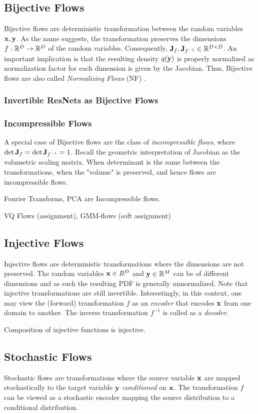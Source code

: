 \documentclass[a4paper, 11pt]{article}
\begin{document}
\subsection{Bijective Flows}
Bijective flows are deterministic transformation between the random variables $\mbox{$\mbox{$\mathbf{x}$}$}, \mbox{$\mbox{$\mathbf{y}$}$}$. As the name suggests, the transformation preserves the dimensions $f: \mathbb{R}^D \to \mathbb{R}^D$ of the random variables. Consequently, $\mbox{$\mbox{$\mathbf{J}$}$}_{f}, \mbox{$\mbox{$\mathbf{J}$}$}_{f^{-1}} \in \mathbb{R}^{D \times D}$. An important implication is that the resulting density $q(\mbox{$\mbox{$\mathbf{y}$}$})$ is properly normalized as normalization factor for each dimension is given by the Jacobian. Thus, Bijective flows are also called \emph{Normalizing Flows} (NF) \cite{papamakarios2021normalizing}. 

\subsubsection{Invertible ResNets as Bijective Flows}


\subsubsection{Incompressible Flows}
A special case of Bijective flows are the class of \emph{incompressible flows}, where $\det \mbox{$\mbox{$\mathbf{J}$}$}_f = \det \mbox{$\mbox{$\mathbf{J}$}$}_{f^{-1}} = 1$. Recall the geometric interpretation of Jacobian as the volumetric scaling matrix. When determinant is the same between the transformations, when the "volume" is preserved, and hence flows are incompressible flows. 

Fourier Transforms, PCA are Incompressible flows. 

VQ Flows (assignment), GMM-flows (soft assignment)


\subsection{Injective Flows}
Injective flows are deterministic transformations where the dimensions are not preserved. The random variables $\mbox{$\mbox{$\mathbf{x}$}$} \in R^D$ and $\mbox{$\mbox{$\mathbf{y}$}$} \in \mathbb{R}^M$ can be of different dimensions and as such the resulting PDF is generally unnormalized. Note that injective transformations are still invertible. Interestingly, in this context, one may view the (forward) transformation $f$ as an \emph{encoder} that encodes $\mbox{$\mbox{$\mathbf{x}$}$}$ from one domain to another. The inverse transformation $f^{-1}$ is called as a \emph{decoder}.


Composition of injective functions is injective.


\subsection{Stochastic Flows}
Stochastic flows are transformations where the source variable $\mbox{$\mbox{$\mathbf{x}$}$}$ are mapped stochastically to the target variable $\mbox{$\mbox{$\mathbf{y}$}$}$ \emph{conditioned} on $\mbox{$\mbox{$\mathbf{x}$}$}$. The transformation $f$ can be viewed as a stochastic encoder mapping the source distribution to a conditional distribution.
\end{document}
